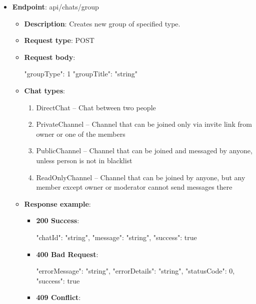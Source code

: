 \begin{itemize}
    \item \textbf{Endpoint}: api/chats/group
    \begin{itemize}
        \item \textbf{Description}: Creates new group of specified type.
        \item \textbf{Request type}: POST
        \item \textbf{Request body}:
        \begin{spverbatim}
        {
            "groupType": 1
            "groupTitle": "string"
        }
        \end{spverbatim}
        \item \textbf{Chat types}:
        \begin{enumerate}
            \item DirectChat -- Chat between two people
            \item PrivateChannel -- Channel that can be joined only via invite link from owner or one of the members
            \item PublicChannel -- Channel that can be joined and messaged by anyone, unless person is not in blacklist
            \item ReadOnlyChannel -- Channel that can be joined by anyone, but any member except owner or moderator cannot send messages there
        \end{enumerate}
        \item \textbf{Response example}:
        \begin{itemize}
            \item \textbf{200 Success}:

            \begin{spverbatim}
            {
                "chatId": "string",
                "message": "string",
                "success": true
            }
            \end{spverbatim}

            \item \textbf{400 Bad Request}:

            \begin{spverbatim}
            {
                "errorMessage": "string",
                "errorDetails": "string",
                "statusCode": 0,
                "success": true
            }
            \end{spverbatim}

            \item \textbf{409 Conflict}:


\end{itemize}
\end{itemize}
\end{itemize}
